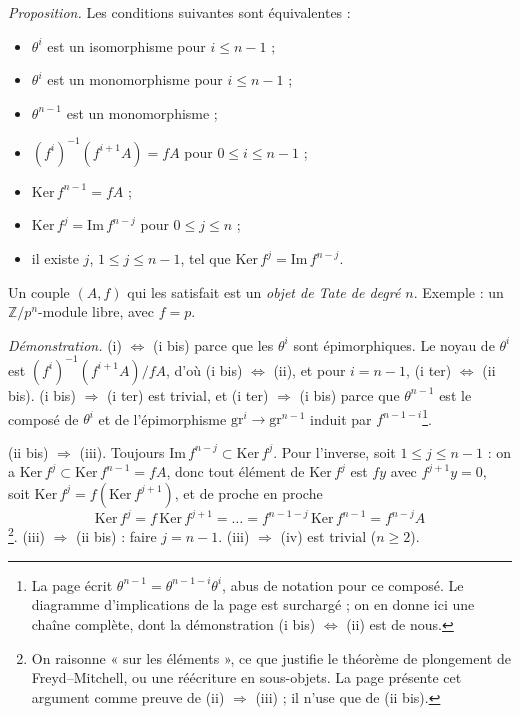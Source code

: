 \documentclass[11pt,a4paper]{article}
\begin{document}
\emph{Proposition.} Les conditions suivantes sont équivalentes :
\begin{itemize}
  \item[(i)] $\theta^{i}$ est un isomorphisme pour $i \leq n-1$ ;
  \item[(i bis)] $\theta^{i}$ est un monomorphisme pour $i \leq n-1$ ;
  \item[(i ter)] $\theta^{n-1}$ est un monomorphisme ;
  \item[(ii)] $(f^{i})^{-1}(f^{i+1}A) = fA$ pour $0 \leq i \leq n-1$ ;
  \item[(ii bis)] $\mathrm{Ker}\, f^{n-1} = fA$ ;
  \item[(iii)] $\mathrm{Ker}\, f^{j} = \mathrm{Im}\, f^{n-j}$ pour
  $0 \leq j \leq n$ ;
  \item[(iv)] il existe $j$, $1 \leq j \leq n-1$, tel que
  $\mathrm{Ker}\, f^{j} = \mathrm{Im}\, f^{n-j}$.
\end{itemize}
Un couple $(A, f)$ qui les satisfait est un \emph{objet de Tate de degré
$n$}. Exemple : un $\mathbb{Z}/p^{n}$-module libre, avec $f = p$.

\emph{Démonstration.} (i) $\Leftrightarrow$ (i bis) parce que les
$\theta^{i}$ sont épimorphiques. Le noyau de $\theta^{i}$ est
$(f^{i})^{-1}(f^{i+1}A)/fA$, d'où (i bis) $\Leftrightarrow$ (ii), et pour
$i = n-1$, (i ter) $\Leftrightarrow$ (ii bis). (i bis) $\Rightarrow$ (i
ter) est trivial, et (i ter) $\Rightarrow$ (i bis) parce que
$\theta^{n-1}$ est le composé de $\theta^{i}$ et de l'épimorphisme
$\mathrm{gr}^{i} \to \mathrm{gr}^{n-1}$ induit par
$f^{n-1-i}$\footnote{La page écrit $\theta^{n-1} =
\theta^{n-1-i}\theta^{i}$, abus de notation pour ce composé. Le
diagramme d'implications de la page est surchargé ; on en donne ici une
chaîne complète, dont la démonstration (i bis) $\Leftrightarrow$ (ii) est
de nous.}.

(ii bis) $\Rightarrow$ (iii). Toujours $\mathrm{Im}\, f^{n-j} \subset
\mathrm{Ker}\, f^{j}$. Pour l'inverse, soit $1 \leq j \leq n-1$ : on a
$\mathrm{Ker}\, f^{j} \subset \mathrm{Ker}\, f^{n-1} = fA$, donc tout
élément de $\mathrm{Ker}\, f^{j}$ est $fy$ avec $f^{j+1}y = 0$, soit
$\mathrm{Ker}\, f^{j} = f(\mathrm{Ker}\, f^{j+1})$, et de proche en
proche
\[
\mathrm{Ker}\, f^{j} = f\,\mathrm{Ker}\, f^{j+1} = \dots =
f^{n-1-j}\,\mathrm{Ker}\, f^{n-1} = f^{n-j}A
\]
\footnote{On raisonne « sur les éléments », ce que justifie le théorème
de plongement de Freyd–Mitchell, ou une réécriture en sous-objets. La page
présente cet argument comme preuve de (ii) $\Rightarrow$ (iii) ; il n'use
que de (ii bis).}. (iii) $\Rightarrow$ (ii bis) : faire $j = n-1$.
(iii) $\Rightarrow$ (iv) est trivial ($n \geq 2$).
\end{document}
